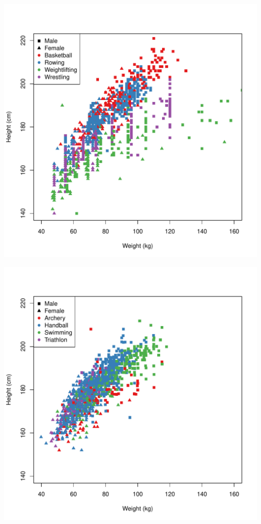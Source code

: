 \documentclass[landscape, paperwidth=42in, paperheight=36in,
fontscale=.35, margin=1in]{baposter}
\begin{document}
\begin{poster}
{\begin{center}
  \begin{minipage}{0.45\textwidth}
    \begin{center}
      \includegraphics[scale=0.27]{../graphics/basketball.pdf}
    \end{center}
  \end{minipage}
  \hspace{0.05\textwidth}
  \begin{minipage}{0.45\textwidth}
    \begin{center}
      \includegraphics[scale=0.27]{../graphics/swimming.pdf}
    \end{center}
  \end{minipage}
  \end{center}
 }


\end{poster}
\end{document}
